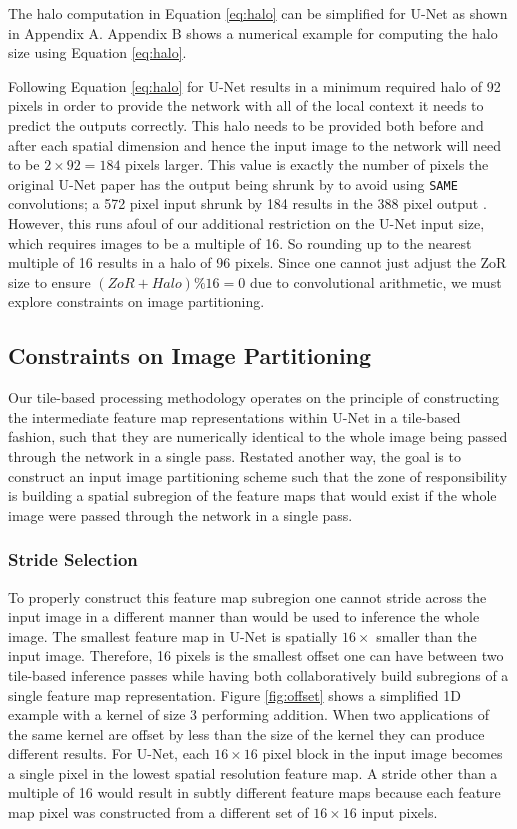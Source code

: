 \documentclass[runningheads]{llncs}
\begin{document}
The halo computation in Equation \ref{eq:halo} can be simplified for U-Net as shown in Appendix A. Appendix B shows a numerical example for computing the halo size using Equation \ref{eq:halo}.

Following Equation \ref{eq:halo} for U-Net results in a minimum required halo of 92 pixels in order to provide the network with all of the local context it needs to predict the outputs correctly. This halo needs to be provided both before and after each spatial dimension and hence the input image to the network will need to be $2 \times 92 = 184$ pixels larger. This value is exactly the number of pixels the original U-Net paper has the output being shrunk by to avoid using \texttt{SAME} convolutions; a 572 pixel input shrunk by 184 results in the 388 pixel output \cite{Ronneberger2015a}. 
However, this runs afoul of our additional restriction on the U-Net input size, which requires images to be a multiple of 16. So rounding up to the nearest multiple of 16 results in a halo of 96 pixels. Since  one cannot just adjust the ZoR size to ensure $(ZoR + Halo) \% 16 = 0$ due to convolutional arithmetic, we must explore constraints on image partitioning. 

\subsection{Constraints on Image Partitioning}

Our tile-based processing methodology operates on the principle of constructing the intermediate feature map representations within U-Net in a tile-based fashion, such that they are numerically identical to the whole image being passed through the network in a single pass. Restated another way, the goal is to construct an input image partitioning scheme such that the zone of responsibility is building a spatial subregion of the feature maps that would exist if the whole image were passed through the network in a single pass. 

\subsubsection{Stride Selection}
To properly construct this feature map subregion one cannot stride across the input image in a different manner than would be used to inference the whole image. The smallest feature map in U-Net is spatially $16 \times$ smaller than the input image. Therefore, 16 pixels is the smallest offset one can have between two tile-based inference passes while having both collaboratively build subregions of a single feature map representation. Figure \ref{fig:offset} shows a simplified 1D example with a kernel of size 3 performing addition. When two applications of the same kernel are offset by less than the size of the kernel they can produce different results. 
For U-Net, each $16 \times 16$ pixel block in the input image becomes a single pixel in the lowest spatial resolution feature map. A stride other than a multiple of 16 would result in subtly different feature maps because each feature map pixel was constructed from a different set of $16 \times 16$ input pixels. 
\end{document}
